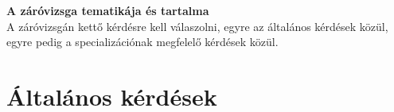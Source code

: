 \def\PAPER{a4paper} %
\def\FONTSIZE{10pt} %
\def\OPTIONS{twoside} %
\def\TARSSZERZO{} %



\setcounter{tocdepth}{3} %


\maketitle
%
\textbf{ A záróvizsga tematikája és tartalma}\\
A záróvizsgán kettő kérdésre kell válaszolni, egyre az általános kérdések közül, egyre pedig a specializációnak megfelelő kérdések közül.
\tableofcontents
\cleardoublepage
\part{Általános kérdések}
\cleardoublepage






%
%
%
%
%
%

%
%
%
%
%
%

